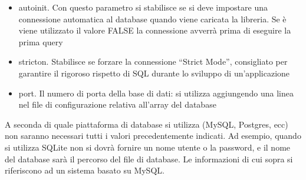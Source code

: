 \begin{itemize}
\item autoinit. Con questo parametro si stabilisce se si deve impostare una connessione automatica al database quando viene caricata la libreria. Se è viene utilizzato il valore FALSE la connessione avverrà prima di eseguire la prima query
\item stricton. Stabilisce se forzare la connessione ``Strict Mode'', consigliato per garantire il rigoroso rispetto di SQL durante lo sviluppo di un'applicazione
\item port. Il numero di porta della base di dati: si utilizza aggiungendo una linea nel file di configurazione relativa all'array del database

\end{itemize}

A seconda di quale piattaforma di database si utilizza (MySQL, Postgres, ecc) non saranno necessari tutti i valori precedentemente indicati. Ad esempio, quando si utilizza SQLite non si dovrà fornire un nome utente o la password, e il nome del database sarà il percorso del file di database. Le informazioni di cui sopra si riferiscono ad un sistema basato su MySQL.
